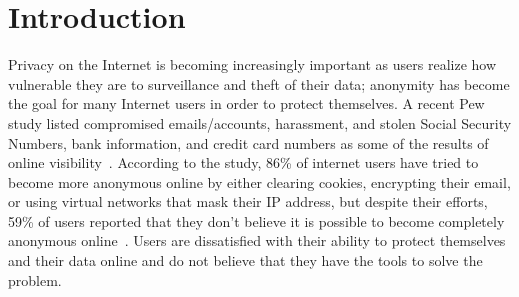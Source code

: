 \documentclass[conference]{IEEEtran}
\begin{document}


%
%


%


\section{Introduction}

Privacy on the Internet is becoming increasingly important as users realize how vulnerable they are to surveillance and theft of their data; anonymity has become the goal for many Internet users in order to protect themselves.  A recent Pew study listed compromised emails/accounts, harassment, and stolen Social Security Numbers, bank information, and credit card numbers as some of the results of online visibility~\cite{pew}.  According to the study, 86\% of internet users have tried to become more anonymous online by either clearing cookies, encrypting their email, or using virtual networks that mask their IP address, but despite their efforts, 59\% of users reported that they don't believe it is possible to become completely anonymous online~\cite{pew}.  Users are dissatisfied with their ability to protect themselves and their data online and do not believe that they have the tools to solve the problem.
\end{document}
